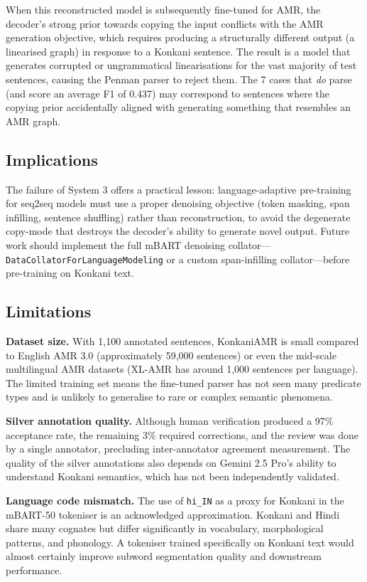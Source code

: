 When this reconstructed model is subsequently fine-tuned for AMR, the decoder's strong prior towards copying the input conflicts with the AMR generation objective, which requires producing a structurally different output (a linearised graph) in response to a Konkani sentence. The result is a model that generates corrupted or ungrammatical linearisations for the vast majority of test sentences, causing the Penman parser to reject them. The 7 cases that \emph{do} parse (and score an average F1 of 0.437) may correspond to sentences where the copying prior accidentally aligned with generating something that resembles an AMR graph.

\subsection{Implications}

The failure of System 3 offers a practical lesson: language-adaptive pre-training for seq2seq models must use a proper denoising objective (token masking, span infilling, sentence shuffling) rather than reconstruction, to avoid the degenerate copy-mode that destroys the decoder's ability to generate novel output. Future work should implement the full mBART denoising collator—\texttt{DataCollatorForLanguageModeling} or a custom span-infilling collator—before pre-training on Konkani text.

\subsection{Limitations}

\textbf{Dataset size.} With 1,100 annotated sentences, KonkaniAMR is small compared to English AMR 3.0 (approximately 59,000 sentences) or even the mid-scale multilingual AMR datasets (XL-AMR has around 1,000 sentences per language). The limited training set means the fine-tuned parser has not seen many predicate types and is unlikely to generalise to rare or complex semantic phenomena.

\textbf{Silver annotation quality.} Although human verification produced a 97\% acceptance rate, the remaining 3\% required corrections, and the review was done by a single annotator, precluding inter-annotator agreement measurement. The quality of the silver annotations also depends on Gemini 2.5 Pro's ability to understand Konkani semantics, which has not been independently validated.

\textbf{Language code mismatch.} The use of \texttt{hi\_IN} as a proxy for Konkani in the mBART-50 tokeniser is an acknowledged approximation. Konkani and Hindi share many cognates but differ significantly in vocabulary, morphological patterns, and phonology. A tokeniser trained specifically on Konkani text would almost certainly improve subword segmentation quality and downstream performance.

